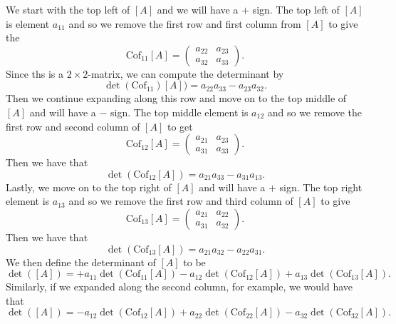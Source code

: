We start with the top left of $[A]$ and we will have a $+$ sign.  The top left of $[A]$ is element $a_{11}$ and so we remove the first row and first column from $[A]$ to give the 
\[
\textrm{Cof}_{11}[A]=\begin{pmatrix} a_{22} & a_{23} \\ a_{32} & a_{33} \end{pmatrix}.
\]
Since ths is a $2\times2$-matrix, we can compute the determinant by \[
\det(\textrm{Cof}_{11})[A])=a_{22} a_{33}- a_{23} a_{32}.
\]
Then we continue expanding along this row and move on to the top middle of $[A]$ and will have a $-$ sign. The top middle element is $a_{12}$ and so we remove the first row and second column of $[A]$ to get
\[
\textrm{Cof}_{12}[A]=\begin{pmatrix} a_{21} & a_{23} \\ a_{31} & a_{33}\end{pmatrix}.
\]
Then we have that 
\[
\det(\textrm{Cof}_{12}[A])=a_{21}a_{33}-a_{31}a_{13}.
\]
Lastly, we move on to the top right of $[A]$ and will have a $+$ sign. The top right element is $a_{13}$ and so we remove the first row and third column of $[A]$ to give
\[
\textrm{Cof}_{13}[A]=\begin{pmatrix} a_{21} & a_{22} \\ a_{31} & a_{32} \end{pmatrix}.
\]
Then we have that
\[
\det(\textrm{Cof}_{13}[A])=a_{21}a_{32} - a_{22}a_{31}.
\]
We then define the determinant of $[A]$ to be
\[
\det([A]) = +a_{11} \det(\textrm{Cof}_{11}[A]) - a_{12} \det(\textrm{Cof}_{12}[A]) + a_{13} \det(\textrm{Cof}_{13}[A]).
\]
Similarly, if we expanded along the second column, for example, we would have that
\[
\det([A]) = -a_{12} \det(\textrm{Cof}_{12}[A]) + a_{22} \det(\textrm{Cof}_{22}[A]) - a_{32} \det(\textrm{Cof}_{32}[A]).
\]

